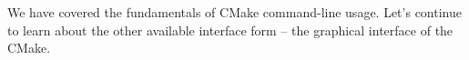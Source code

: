 We have covered the fundamentals of CMake command-line usage. Let's continue to learn about the other available interface form – the graphical interface of the CMake.











